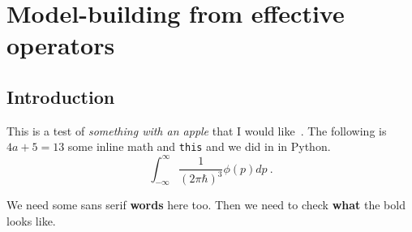 \graphicspath{{img/chapter_2/}}

\chapter{Model-building from effective operators}
\label{chapter:modelbuilding}

\section{Introduction}

This is a test of \textit{something with an apple} that I would like~\cite{Weinberg:1967tq}.
The following is $4a + 5 = 13$ some inline math and \texttt{this} and we did in in \textsf{Python}.
\begin{equation}
  \label{eq:1}
  \int_{-\infty}^{\infty} \frac{1}{(2\pi \hbar)^{3}} \phi(p) dp \ .
\end{equation}

\textsf{We need some sans serif \textbf{words} here too.} Then we need to check
\textbf{what} the bold looks like.

